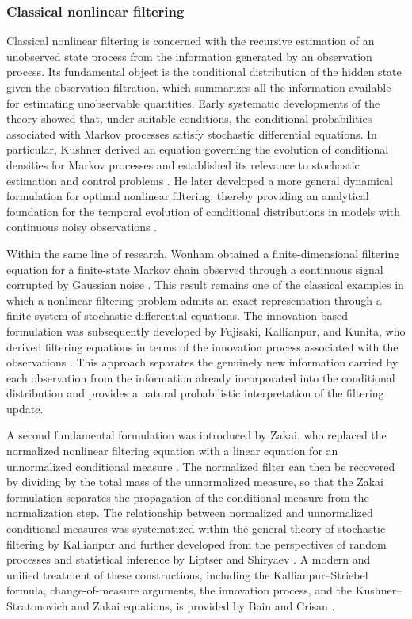 \documentclass[10pt,twocolumn]{article}
\theoremstyle{remark}
\begin{document}
\subsubsection{Classical nonlinear filtering}

Classical nonlinear filtering is concerned with the recursive estimation of an unobserved state process from the information generated by an observation process. Its fundamental object is the conditional distribution of the hidden state given the observation filtration, which summarizes all the information available for estimating unobservable quantities. Early systematic developments of the theory showed that, under suitable conditions, the conditional probabilities associated with Markov processes satisfy stochastic differential equations. In particular, Kushner derived an equation governing the evolution of conditional densities for Markov processes and established its relevance to stochastic estimation and control problems \citep{Kushner1964ConditionalDensities}. He later developed a more general dynamical formulation for optimal nonlinear filtering, thereby providing an analytical foundation for the temporal evolution of conditional distributions in models with continuous noisy observations \citep{Kushner1967DynamicalEquations}.

Within the same line of research, Wonham obtained a finite-dimensional filtering equation for a finite-state Markov chain observed through a continuous signal corrupted by Gaussian noise \citep{Wonham1964NonlinearFiltering}. This result remains one of the classical examples in which a nonlinear filtering problem admits an exact representation through a finite system of stochastic differential equations. The innovation-based formulation was subsequently developed by Fujisaki, Kallianpur, and Kunita, who derived filtering equations in terms of the innovation process associated with the observations \citep{FujisakiKallianpurKunita1972Filtering}. This approach separates the genuinely new information carried by each observation from the information already incorporated into the conditional distribution and provides a natural probabilistic interpretation of the filtering update.

A second fundamental formulation was introduced by Zakai, who replaced the normalized nonlinear filtering equation with a linear equation for an unnormalized conditional measure \citep{Zakai1969OptimalFiltering}. The normalized filter can then be recovered by dividing by the total mass of the unnormalized measure, so that the Zakai formulation separates the propagation of the conditional measure from the normalization step. The relationship between normalized and unnormalized conditional measures was systematized within the general theory of stochastic filtering by Kallianpur \cite{Kallianpur1980StochasticFiltering} and further developed from the perspectives of random processes and statistical inference by Liptser and Shiryaev \cite{LiptserShiryaev2001StatisticsRandomProcessesII}. A modern and unified treatment of these constructions, including the Kallianpur--Striebel formula, change-of-measure arguments, the innovation process, and the Kushner--Stratonovich and Zakai equations, is provided by Bain and Crisan \cite{BainCrisan2009StochasticFiltering}.
\end{document}
